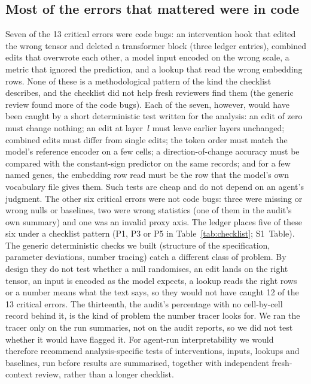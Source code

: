 \documentclass[10pt,letterpaper]{article}
\begin{document}
\subsection*{Most of the errors that mattered were in code}
Seven of the 13 critical errors were code bugs: an intervention hook that
edited the wrong tensor and deleted a transformer block (three ledger
entries), combined edits that overwrote each other, a model input encoded
on the wrong scale, a metric that ignored the prediction, and a lookup
that read the wrong embedding rows. None of these is a methodological
pattern of the kind the checklist describes, and the checklist did not
help fresh reviewers find them (the generic review found more of the code
bugs). Each of the seven, however, would have been caught by a short
deterministic test written for the analysis: an edit of zero must change
nothing; an edit at layer~$l$ must leave earlier layers unchanged;
combined edits must differ from single edits; the token order must match
the model's reference encoder on a few cells; a direction-of-change
accuracy must be compared with the constant-sign predictor on the same
records; and for a few named genes, the embedding row read must be the
row that the model's own vocabulary file gives them. Such tests are cheap
and do not depend on an agent's judgment. The other six critical errors
were not code bugs: three were missing or wrong nulls or baselines, two
were wrong statistics (one of them in the audit's own summary) and one
was an invalid proxy axis. The ledger places five of these six under a
checklist pattern (P1, P3 or P5 in Table~\ref{tab:checklist}; S1~Table).
The generic deterministic checks we built (structure of the
specification, parameter deviations, number tracing) catch a different
class of problem. By design they do not test whether a null randomises,
an edit lands on the right tensor, an input is encoded as the model
expects, a lookup reads the right rows or a number means what the text
says, so they would not have caught 12 of the 13 critical errors. The thirteenth, the audit's percentage with
no cell-by-cell record behind it, is the kind of problem the number
tracer looks for. We ran the tracer only on the run summaries, not on the
audit reports, so we did not test whether it would have flagged it. For
agent-run interpretability we would therefore recommend
analysis-specific tests of interventions, inputs, lookups and baselines,
run before results are summarised, together with independent
fresh-context review, rather than a longer checklist.
\end{document}
